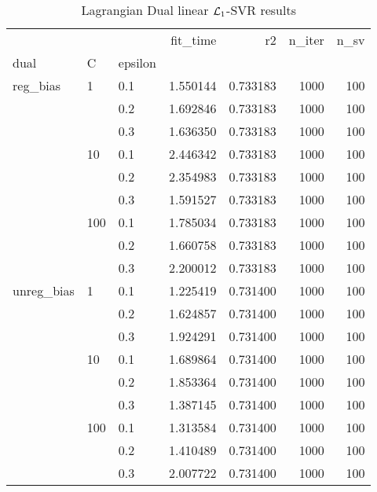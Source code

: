 \begin{table}[H]
\centering
\caption{Lagrangian Dual linear $\protect \mathcal{L}_1$-SVR results}
\label{linear_lagrangian_dual_l1_svr_cv_results}
\begin{tabular}{lllrrrr}
\toprule
           &     &     &  fit\_time &        r2 &  n\_iter &  n\_sv \\
dual & C & epsilon &           &           &         &       \\
\midrule
reg\_bias & 1   & 0.1 &  1.550144 &  0.733183 &    1000 &   100 \\
           &     & 0.2 &  1.692846 &  0.733183 &    1000 &   100 \\
           &     & 0.3 &  1.636350 &  0.733183 &    1000 &   100 \\
           & 10  & 0.1 &  2.446342 &  0.733183 &    1000 &   100 \\
           &     & 0.2 &  2.354983 &  0.733183 &    1000 &   100 \\
           &     & 0.3 &  1.591527 &  0.733183 &    1000 &   100 \\
           & 100 & 0.1 &  1.785034 &  0.733183 &    1000 &   100 \\
           &     & 0.2 &  1.660758 &  0.733183 &    1000 &   100 \\
           &     & 0.3 &  2.200012 &  0.733183 &    1000 &   100 \\
unreg\_bias & 1   & 0.1 &  1.225419 &  0.731400 &    1000 &   100 \\
           &     & 0.2 &  1.624857 &  0.731400 &    1000 &   100 \\
           &     & 0.3 &  1.924291 &  0.731400 &    1000 &   100 \\
           & 10  & 0.1 &  1.689864 &  0.731400 &    1000 &   100 \\
           &     & 0.2 &  1.853364 &  0.731400 &    1000 &   100 \\
           &     & 0.3 &  1.387145 &  0.731400 &    1000 &   100 \\
           & 100 & 0.1 &  1.313584 &  0.731400 &    1000 &   100 \\
           &     & 0.2 &  1.410489 &  0.731400 &    1000 &   100 \\
           &     & 0.3 &  2.007722 &  0.731400 &    1000 &   100 \\
\bottomrule
\end{tabular}
\end{table}
